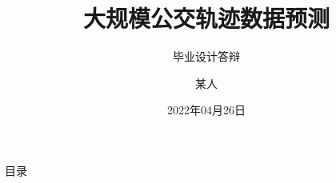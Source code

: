 \documentclass[aspectratio=169]{beamer}
\author{某人}
\title{大规模公交轨迹数据预测}
\subtitle{毕业设计答辩}
\institute{武汉大学计算机学院}
\date{2022年04月26日}
\begin{document}
\kaishu
\begin{frame}
    \titlepage
    
\end{frame}

\begin{frame}{目录}
                
        \transfade %
        \tableofcontents
\end{frame}









\end{document}
